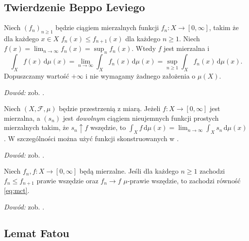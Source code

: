 \subsection{Twierdzenie Beppo Leviego}


\begin{twierdzenie}
\label{thm:mct}
Niech $(f_n)_{n\ge1}$ będzie ciągiem mierzalnych funkcji
$f_n:X\to[0,\infty]$, takim że dla każdego $x\in X$
$f_n(x)\le f_{n+1}(x)$ dla każdego $n\ge1$. Niech
$f(x)=\lim_{n\to\infty}f_n(x)=\sup_nf_n(x)$.
Wtedy $f$ jest mierzalna i
\begin{equation}\label{eq:mct}
\int_Xf(x)\,\mathrm d\mu(x)
=\lim_{n\to\infty}\int_Xf_n(x)\,\mathrm d\mu(x)
=\sup_{n\ge1}\int_Xf_n(x)\,\mathrm d\mu(x).
\end{equation}
Dopuszczamy wartość $+\infty$ i nie wymagamy
żadnego założenia o $\mu(X)$.
\end{twierdzenie}
\noindent\emph{Dowód:} zob. .

\begin{wniosek}
\label{cor:simple-approx-integral}
Niech $(X,\mathcal F,\mu)$ będzie przestrzenią z miarą.
Jeżeli $f:X\to[0,\infty]$ jest mierzalna, a
$(s_n)$ jest \emph{dowolnym} ciągiem nieujemnych
funkcji prostych mierzalnych takim, że $s_n\uparrow f$
wszędzie, to
$\int_Xf\,\mathrm d\mu(x)=
\lim_{n\to\infty}\int_Xs_n\,\mathrm d\mu(x)$.
W szczególności można użyć funkcji skonstruowanych w
.
\end{wniosek}
\noindent\emph{Dowód:} zob. .

\begin{twierdzenie}
\label{thm:mct-ae}
Niech $f_n,f:X\to[0,\infty]$ będą mierzalne.
Jeśli dla każdego $n\ge1$ zachodzi $f_n\le f_{n+1}$ prawie wszędzie oraz $f_n\to f$
$\mu$-prawie wszędzie, to zachodzi równość
\eqref{eq:mct}.
\end{twierdzenie}
\noindent\emph{Dowód:} zob. .

\subsection{Lemat Fatou}


